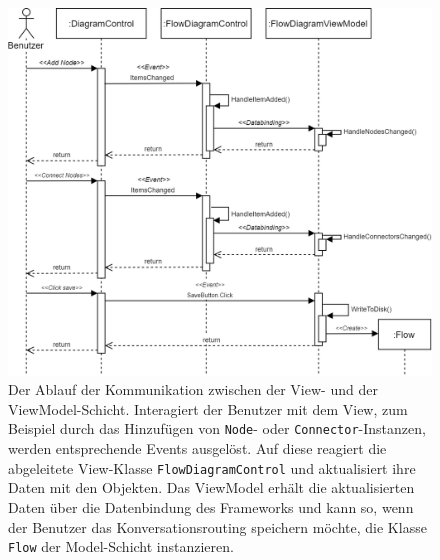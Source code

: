 \begin{figure} %
	\centering
		\includegraphics[width=\textwidth]{img/MVVMSequence.png}
	\caption[Kommunikationsablauf zwischen View- und ViewModel-Schicht]{Der Ablauf der Kommunikation zwischen der View- und der ViewModel-Schicht. Interagiert der Benutzer mit dem View, zum Beispiel durch das Hinzufügen von \texttt{Node}- oder \texttt{Connector}-Instanzen, werden entsprechende Events ausgelöst. Auf diese reagiert die abgeleitete View-Klasse \texttt{FlowDiagramControl} und aktualisiert ihre Daten mit den Objekten. Das ViewModel erhält die aktualisierten Daten über die Datenbindung des Frameworks und kann so, wenn der Benutzer das Konversationsrouting speichern möchte, die Klasse \texttt{Flow} der Model-Schicht instanzieren.}
	\label{fig:UML:MVVMSequence}
\end{figure}


